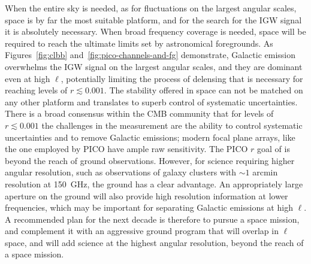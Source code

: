\documentclass[PICOReport.tex]{subfiles}
\begin{document}
When the entire sky is needed, as for fluctuations on the largest angular scales, space is by far the most suitable platform, and for the search for the \ac{IGW} signal it is absolutely necessary. When broad frequency coverage is needed, space will be required to reach the ultimate limits set by astronomical foregrounds.  As Figures~\ref{fig:clbb} and~\ref{fig:pico-channels-and-fg} demonstrate, Galactic emission overwhelms the \ac{IGW} signal on the largest angular scales, and they are dominant even at high $\ell$, potentially limiting the process of delensing that is necessary for reaching levels of $r\lesssim0.001$. The stability offered in space can not be matched on any other platform and translates to superb control of systematic uncertainties. There is a broad consensus within the CMB community that for levels of $r \lesssim 0.001$ the challenges in the measurement are the ability to control systematic uncertainties and to remove Galactic emissions; modern focal plane arrays, like the one employed by PICO have ample raw sensitivity. The PICO $r$ goal of  is beyond the reach of ground observations.  However, for science requiring higher angular resolution, such as observations of galaxy clusters with $\sim1$ arcmin resolution at 150~GHz, the ground has a clear advantage. An appropriately large aperture on the ground will also provide high resolution information at lower frequencies, which may be important for separating Galactic emissions at high $\ell$. 
A recommended plan for the next decade is therefore to pursue a space mission, and complement it with an aggressive ground program that will overlap in $\ell$ space, and will add science at the highest angular resolution, beyond the reach of a space mission. 

\end{document}

